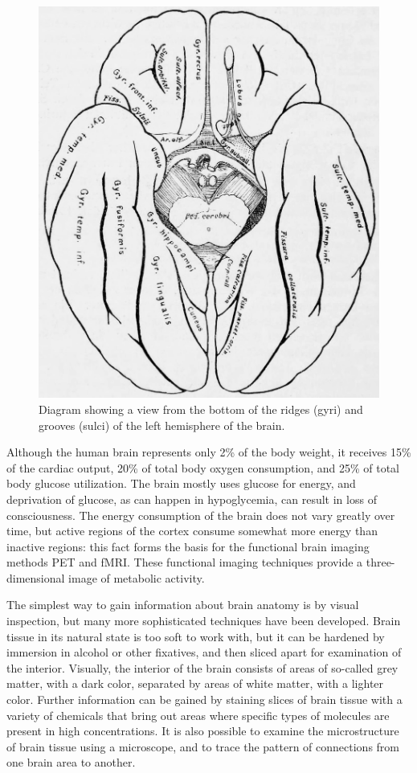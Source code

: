 \begin{figure}

{\centering \includegraphics[width=0.7\linewidth]{./figures/nervoussystem/gyri_bot} 

}

\caption{Diagram showing a view from the bottom of the ridges (gyri) and grooves (sulci) of the left hemisphere of the brain.}\label{fig:gyribottom}
\end{figure}

Although the human brain represents only 2\% of the body weight, it receives 15\% of the cardiac output, 20\% of total body oxygen consumption, and 25\% of total body glucose utilization. The brain mostly uses glucose for energy, and deprivation of glucose, as can happen in hypoglycemia, can result in loss of consciousness. The energy consumption of the brain does not vary greatly over time, but active regions of the cortex consume somewhat more energy than inactive regions: this fact forms the basis for the functional brain imaging methods PET and fMRI. These functional imaging techniques provide a three-dimensional image of metabolic activity.

The simplest way to gain information about brain anatomy is by visual inspection, but many more sophisticated techniques have been developed. Brain tissue in its natural state is too soft to work with, but it can be hardened by immersion in alcohol or other fixatives, and then sliced apart for examination of the interior. Visually, the interior of the brain consists of areas of so-called grey matter, with a dark color, separated by areas of white matter, with a lighter color. Further information can be gained by staining slices of brain tissue with a variety of chemicals that bring out areas where specific types of molecules are present in high concentrations. It is also possible to examine the microstructure of brain tissue using a microscope, and to trace the pattern of connections from one brain area to another.

